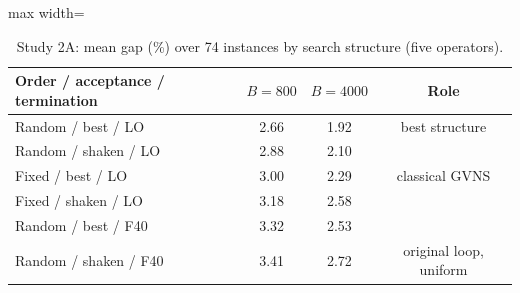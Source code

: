 \begin{table}[t]
\caption{Study 2A: mean gap (\%) over 74 instances by search structure (five operators).}\label{tab:s2a}
\centering
\small
\begin{adjustbox}{max width=\linewidth}
\begin{tabular}{lccc}
\toprule
Order / acceptance / termination & $B=800$ & $B=4000$ & Role \\
\midrule
Random / best / LO & 2.66 & 1.92 & best structure \\
Random / shaken / LO & 2.88 & 2.10 &  \\
Fixed / best / LO & 3.00 & 2.29 & classical GVNS \\
Fixed / shaken / LO & 3.18 & 2.58 &  \\
Random / best / F40 & 3.32 & 2.53 &  \\
Random / shaken / F40 & 3.41 & 2.72 & original loop, uniform \\
\bottomrule
\end{tabular}
\end{adjustbox}
\end{table}
